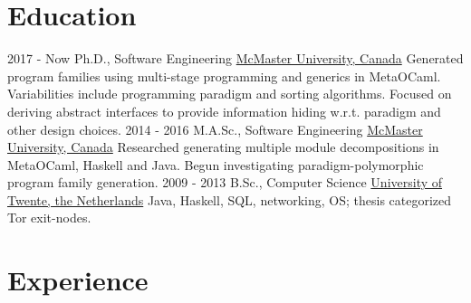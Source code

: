 \documentclass[letterpaper]{twentysecondcv} %
\begin{document}
\makeprofile %



\section{Education}

\begin{twenty} %
  \twentyitem
    {2017 - Now}
    {}
    {Ph.D., Software Engineering}
    {\href{https://www.mcmaster.ca/}{McMaster University, Canada}}
    {Generated program families using multi-stage programming and generics in MetaOCaml. Variabilities include programming paradigm and sorting algorithms. Focused on deriving abstract interfaces to provide information hiding w.r.t. paradigm and other design choices.}
    {}
  \twentyitem
    {2014 - 2016}
    {}
    {M.A.Sc., Software Engineering}
    {\href{https://www.mcmaster.ca/}{McMaster University, Canada}}
    {Researched generating multiple module decompositions in MetaOCaml, Haskell and Java. Begun investigating paradigm-polymorphic program family generation.}
    {}
  \twentyitem
    {2009 - 2013}
    {}
    {B.Sc., Computer Science}%
    {\href{https://www.utwente.nl/}{University of Twente, the Netherlands}}
    {Java, Haskell, SQL, networking, OS; thesis categorized Tor exit-nodes.}
    {}
\end{twenty}
\vspace{-.5em}


\section{Experience}
\end{document}
